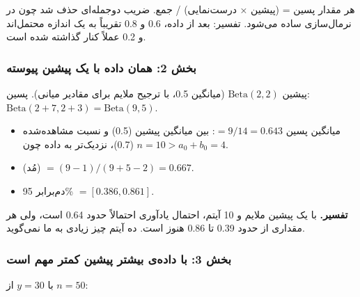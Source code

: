 هر مقدار پسین = (پیشین × درست‌نمایی) / جمع. ضریب دوجمله‌ای حذف شد چون در
نرمال‌سازی ساده می‌شود. تفسیر: بعد از داده، 0.6 و 0.8 تقریباً به یک اندازه
محتمل‌اند و 0.2 عملاً کنار گذاشته شده است.

\subsubsection{\texorpdfstring{بخش 2: همان داده با یک پیشین 
پیوسته}{بخش 2: همان داده با یک پیشین Beta پیوسته}}

پیشین \(\mathrm{Beta}(2, 2)\) (میانگین 0.5، با ترجیح ملایم برای مقادیر
میانی). پسین: \(\mathrm{Beta}(2 + 7,\allowbreak 2 + 3) = \mathrm{Beta}(9,\allowbreak 5)\).

\begin{itemize}
\tightlist
\item
  میانگین پسین \(= 9/14 = 0.643\): بین میانگین پیشین (0.5) و نسبت
  مشاهده‌شده (0.7)، نزدیک‌تر به داده چون \(n = 10 > a_0 + b_0 = 4\).
\item
   (مُد) \(= (9 - 1)/(9 + 5 - 2) = 0.667\).
\item
   دم‌برابر 95\% \(= [0.386, 0.861]\).
\end{itemize}

\textbf{تفسیر.} با یک پیشین ملایم و 10 آیتم، احتمال یادآوری احتمالاً حدود
0.64 است، ولی هر مقداری از حدود 0.39 تا 0.86 هنوز  است. ده
آیتم چیز زیادی به ما نمی‌گوید.

\subsubsection{بخش 3: با داده‌ی بیشتر پیشین کمتر مهم است}

با \(y = 30\) از \(n = 50\):

